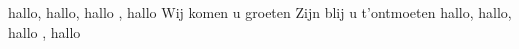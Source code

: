 \beginverse*
hallo, hallo, hallo , hallo
Wij komen u groeten
Zijn blij u t'ontmoeten
hallo, hallo, hallo , hallo
\endverse
\endsong